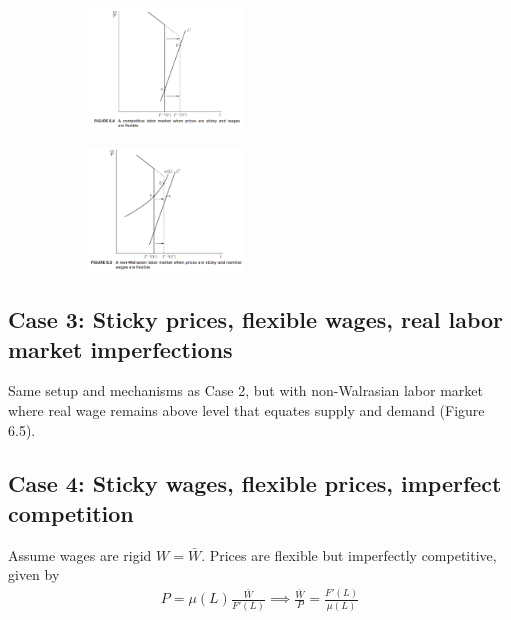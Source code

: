 \documentclass[../main.tex]{subfiles}
\begin{document}
        \begin{figure}[h!]
            \centering
            \begin{subfigure}   
                \centering
                \includegraphics[width=0.45\textwidth]{./attachments/6.3-case2.png}
            \end{subfigure}
            \begin{subfigure}  
                \centering
                \includegraphics[width=0.45\textwidth]{./attachments/6.4-case3.png}
            \end{subfigure}
            \label{fig:6.4}
        \end{figure}
        
    \subsection*{Case 3: Sticky prices, flexible wages, real labor market imperfections}
        
        Same setup and mechanisms as Case 2, but with non-Walrasian labor market where real wage remains above level that equates supply and demand (Figure 6.5).
        
    \subsection*{Case 4: Sticky wages, flexible prices, imperfect competition}
    
        Assume wages are rigid $W = \bar W$. Prices are flexible but imperfectly competitive, given by
        \begin{align}
            P = \mu(L) \frac{\bar W}{F'(L)}
            \implies
            \frac{\bar W}{P} = \frac{F'(L)}{\mu(L)}
        \end{align}
        
\end{document}
